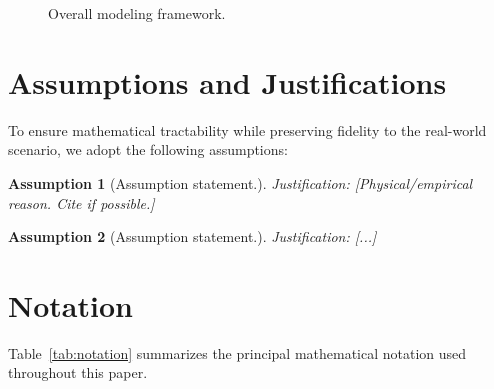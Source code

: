 \documentclass{mcmthesis}
\newtheorem{assumption}{Assumption}
\begin{document}
\begin{figure}[H]
\centering
{}
\caption{Overall modeling framework.}
\label{fig:flowchart}
\end{figure}

\section{Assumptions and Justifications}

To ensure mathematical tractability while preserving fidelity to the real-world scenario, we adopt the following assumptions:

\begin{assumption}
    [Assumption statement.]
    \textit{Justification:} [Physical/empirical reason. Cite if possible.]
\end{assumption}

\begin{assumption}
    [Assumption statement.]
    \textit{Justification:} [...]
\end{assumption}


\section{Notation}

Table~\ref{tab:notation} summarizes the principal mathematical notation used throughout this paper.
\end{document}
